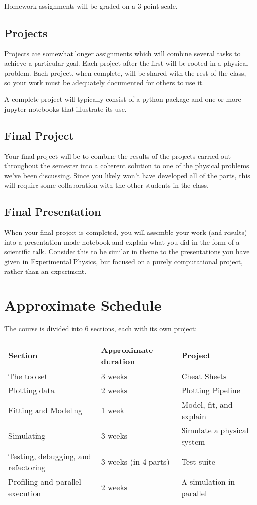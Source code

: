 \documentclass{tufte-handout}
\begin{document}
Homework assignments will be graded on a 3 point scale.
\subsection{Projects}
\label{sec-4-2}
Projects are somewhat longer assignments which will combine several tasks to achieve a particular goal. Each project after the first will be rooted in a physical problem. Each project, when complete, will be shared with the rest of the class, so your work must be adequately documented for others to use it.

A complete project will typically consist of a python package and one or more jupyter notebooks that illustrate its use. 

\subsection{Final Project}
\label{sec-4-3}
Your final project will be to combine the results of the projects carried out throughout the semester into a coherent solution to one of the physical problems we've been discussing. Since you likely won't have developed all of the parts, this will require some collaboration with the other students in the class.

\subsection{Final Presentation}
\label{sec-4-4}
When your final project is completed, you will assemble your work (and results) into a presentation-mode notebook and explain what you did in the form of a scientific talk. Consider this to be similar in theme to the presentations you have given in Experimental Physics, but focused on a purely computational project, rather than an experiment.

\section{Approximate Schedule}
\label{sec-5}
The course is divided into 6 sections, each with its own project:

\begin{center}
\begin{tabular}{lll}
Section & Approximate duration & Project\\
\hline
The toolset & 3 weeks & Cheat Sheets\\
Plotting data & 2 weeks & Plotting Pipeline\\
Fitting and Modeling & 1 week & Model, fit, and explain\\
Simulating & 3 weeks & Simulate a physical system\\
Testing, debugging, and refactoring & 3 weeks (in 4 parts) & Test suite\\
Profiling and parallel execution & 2 weeks & A simulation in parallel\\
\end{tabular}
\end{center}
\end{document}
